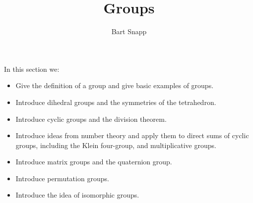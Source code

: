 \documentclass{ximera}
\author{Bart Snapp}
\title{Groups}
\begin{document}
\begin{abstract}
\end{abstract}
\maketitle
In this section we:

\begin{itemize}
\item Give the definition of a group and give basic examples of
  groups.
\item Introduce dihedral groups and the symmetries of the tetrahedron.
\item Introduce cyclic groups and the division theorem.
\item Introduce ideas from number theory and apply them to direct sums
  of cyclic groups, including the Klein four-group, and multiplicative
  groups.
\item Introduce matrix groups and the quaternion group.
\item Introduce permutation groups.
\item Introduce the idea of isomorphic groups.
\end{itemize}
\end{document}
